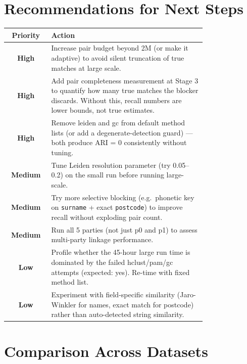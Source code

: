 \documentclass[11pt, a4paper]{article}
\begin{document}
\section{Recommendations for Next Steps}

\begin{table}[h!]
\centering
\begin{tabular}{cp{0.78\linewidth}}
\toprule
\textbf{Priority} & \textbf{Action} \\
\midrule
{\color{highprio}\textbf{High}}   & Increase pair budget beyond 2M (or make it adaptive) to avoid silent truncation of true matches at large scale. \\[4pt]
{\color{highprio}\textbf{High}}   & Add pair completeness measurement at Stage 3 to quantify how many true matches the blocker discards. Without this, recall numbers are lower bounds, not true estimates. \\[4pt]
{\color{highprio}\textbf{High}}   & Remove leiden and gc from default method lists (or add a degenerate-detection guard) --- both produce ARI = 0 consistently without tuning. \\[4pt]
{\color{medprio}\textbf{Medium}}  & Tune Leiden resolution parameter (try 0.05--0.2) on the small run before running large-scale. \\[4pt]
{\color{medprio}\textbf{Medium}}  & Try more selective blocking (e.g.\ phonetic key on \texttt{surname} + exact \texttt{postcode}) to improve recall without exploding pair count. \\[4pt]
{\color{medprio}\textbf{Medium}}  & Run all 5 parties (not just p0 and p1) to assess multi-party linkage performance. \\[4pt]
{\color{lowprio}\textbf{Low}}     & Profile whether the 45-hour large run time is dominated by the failed hclust/pam/gc attempts (expected: yes). Re-time with fixed method list. \\[4pt]
{\color{lowprio}\textbf{Low}}     & Experiment with field-specific similarity (Jaro-Winkler for names, exact match for postcode) rather than auto-detected string similarity. \\
\bottomrule
\end{tabular}
\end{table}

\section{Comparison Across Datasets}
\end{document}

